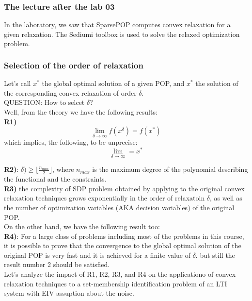 \subsubsection{The lecture after the lab 03}
In the laboratory, we saw that SparsePOP computes convex relaxation for a given relaxation. The Sediumi toolbox is used to solve the relaxed optimization problem.\\

\subsubsection{Selection of the order of relaxation}
Let's call $x^*$ the global optimal solution of a given POP, and $x^*$ the solution of the corresponding convex relaxation of order $\delta$.\\

QUESTION: How to selcet $\delta$?\\
Well, from the theory we have the following results:\\
\textbf{R1)} 
\[
\lim\limits_{\delta \to \infty} f(x^\delta) = f(x^*)
\]
which implies, the following, to be unprecise:
\[
\lim\limits_{\delta \to \infty} = x^*
\]

\textbf{R2)}: \(\delta) \geq \lfloor \frac{n_{max}}{2} \rfloor\), where $n_{max}$ is the maximum degree of the polynomial describing the functional and the constraints.\\

\textbf{R3)} the complexity of SDP problem obtained by applying to the original convex relaxation techniques grows exponentially in the order of relaxatoin $\delta$, as well as the number of optimization variables (AKA decision variables) of the original POP.\\

On the other hand, we have the following result too:\\

\textbf{R4)}: For a large class of problems including most of the problems in this course, it is possible to prove that the convergence to the global optimal solution of the original POP is very fast and it is achieved for a finite value of $\delta$. but still the result number 2 should be satisfied.\\

Let's analyze the impact of R1, R2, R3, and R4 on the applicationo of convex relaxation techniques to a set-membership identification problem of an LTI system with EIV assuption about the noise.\\


